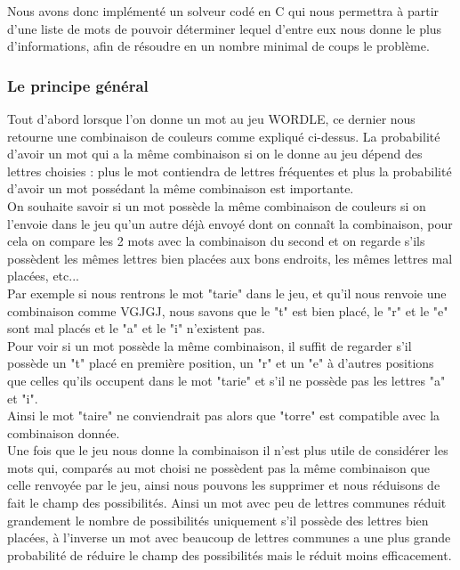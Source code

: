 Nous avons donc implémenté un solveur codé en C qui nous permettra à partir d'une liste de mots de pouvoir déterminer lequel d'entre eux nous donne le plus d'informations, afin de résoudre en un nombre minimal de coups le problème.\\

\subsubsection{Le principe général}

Tout d'abord lorsque l'on donne un mot au jeu WORDLE, ce dernier nous retourne une combinaison de couleurs comme expliqué ci-dessus. La probabilité d'avoir un mot qui a la même combinaison si on le donne au jeu dépend des lettres choisies : plus le mot contiendra de lettres fréquentes et plus la probabilité d'avoir un mot possédant la même combinaison est importante.\\

On souhaite savoir si un mot possède la même combinaison de couleurs si on l'envoie dans le jeu qu'un autre déjà envoyé dont on connaît la combinaison, pour cela on compare les 2 mots avec la combinaison du second et on regarde s'ils possèdent les mêmes lettres bien placées aux bons endroits, les mêmes lettres mal placées, etc... \\
Par exemple si nous rentrons le mot "tarie" dans le jeu, et qu'il nous renvoie une combinaison comme VGJGJ, nous savons que le "t" est bien placé, le "r" et le "e" sont mal placés et le "a" et le "i" n'existent pas. \\
Pour voir si un mot possède la même combinaison, il suffit de regarder s'il possède un "t" placé en première position, un "r" et un "e" à d'autres positions que celles qu'ils occupent dans le mot "tarie" et s'il ne possède pas les lettres "a" et "i". \\
Ainsi le mot "taire" ne conviendrait pas alors que "torre" est compatible avec la combinaison donnée. \\

Une fois que le jeu nous donne la combinaison il n'est plus utile de considérer les mots qui, comparés au mot choisi ne possèdent pas la même combinaison que celle renvoyée par le jeu, ainsi nous pouvons les supprimer et nous réduisons de fait le champ des possibilités. Ainsi un mot avec peu de lettres communes réduit grandement le nombre de possibilités uniquement s'il possède des lettres bien placées, à l'inverse un mot avec beaucoup de lettres communes a une plus grande probabilité de réduire le champ des possibilités mais le réduit moins efficacement. \\

